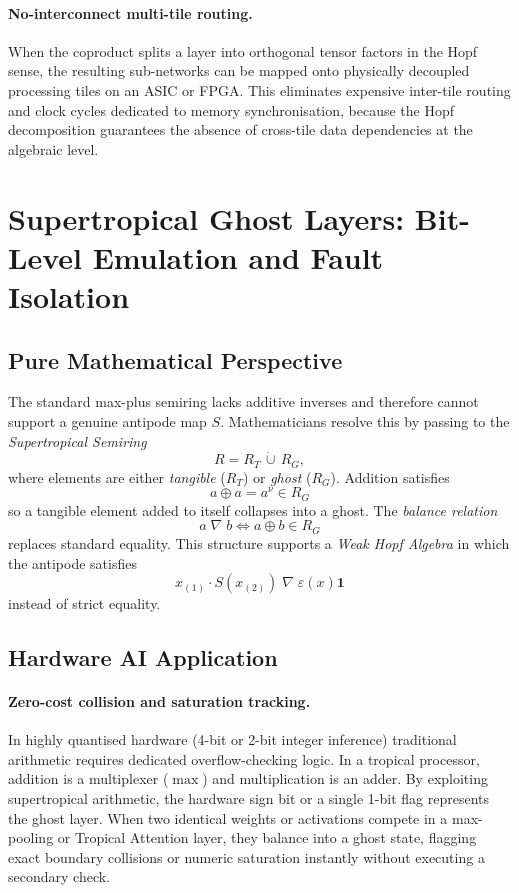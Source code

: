 \documentclass[11pt]{article}
\begin{document}
\paragraph{No-interconnect multi-tile routing.}
When the coproduct splits a layer into orthogonal tensor factors in the Hopf sense, the resulting sub-networks can be mapped onto physically decoupled processing tiles on an ASIC or FPGA. This eliminates expensive inter-tile routing and clock cycles dedicated to memory synchronisation, because the Hopf decomposition guarantees the absence of cross-tile data dependencies at the algebraic level.

\section{Supertropical Ghost Layers: Bit-Level Emulation and Fault Isolation}

\subsection{Pure Mathematical Perspective}

The standard max-plus semiring lacks additive inverses and therefore cannot support a genuine antipode map $S$. Mathematicians resolve this by passing to the \emph{Supertropical Semiring}
\[
R = R_T \,\dot\cup\, R_G,
\]
where elements are either \emph{tangible} ($R_T$) or \emph{ghost} ($R_G$). Addition satisfies
\begin{equation}
a \oplus a = a^\nu \in R_G
\end{equation}
so a tangible element added to itself collapses into a ghost. The \emph{balance relation}
\begin{equation}
a \;\nabla\; b \iff a \oplus b \in R_G
\end{equation}
replaces standard equality. This structure supports a \emph{Weak Hopf Algebra} in which the antipode satisfies
\begin{equation}
x_{(1)} \cdot S(x_{(2)}) \;\nabla\; \varepsilon(x)\mathbf{1}
\end{equation}
instead of strict equality.

\subsection{Hardware AI Application}

\paragraph{Zero-cost collision and saturation tracking.}
In highly quantised hardware (4-bit or 2-bit integer inference) traditional arithmetic requires dedicated overflow-checking logic. In a tropical processor, addition is a multiplexer ($\max$) and multiplication is an adder. By exploiting supertropical arithmetic, the hardware sign bit or a single 1-bit flag represents the ghost layer. When two identical weights or activations compete in a max-pooling or Tropical Attention layer, they balance into a ghost state, flagging exact boundary collisions or numeric saturation instantly without executing a secondary check.
\end{document}
